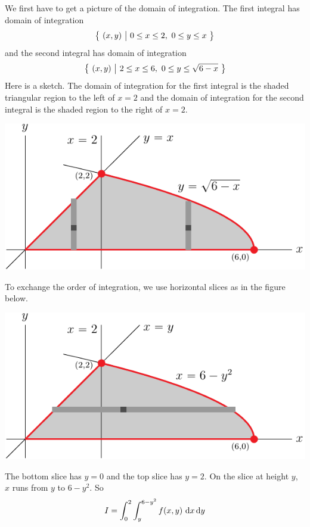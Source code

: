\begin{solution}
We first have to get a picture of the domain of integration.
The first integral has domain of integration
\begin{equation*}
\big\{ \ (x,y)\ \big|\ 0\le x\le 2,\ 0\le y\le x\ \big\}
\end{equation*} 
and the second integral has domain of integration
\begin{equation*}
\big\{ \ (x,y)\ \big|\ 2\le x\le 6,\ 0\le y\le \sqrt{6-x}\ \big\}
\end{equation*} 
Here is a sketch. The domain of integration for the first integral
is the shaded triangular region to the left of $x=2$ and the domain
of integration for the second integral is the shaded region to the right
of $x=2$.

\begin{center}
     \includegraphics{fig/OE14A_6.pdf}
\end{center}

To exchange the order of integration, we use horizontal slices as in the
figure below.

\begin{center}
     \includegraphics{fig/OE14A_6h.pdf}
\end{center}

The bottom slice has $y=0$ and the top slice has $y=2$.
On the slice at height $y$, $x$ runs from $y$ to $6-y^2$. So
\begin{equation*}
I = \int_0^2 \int_y^{6-y^2} f(x,y)\ \dee{x}\,\dee{y}
\end{equation*}
\end{solution}


